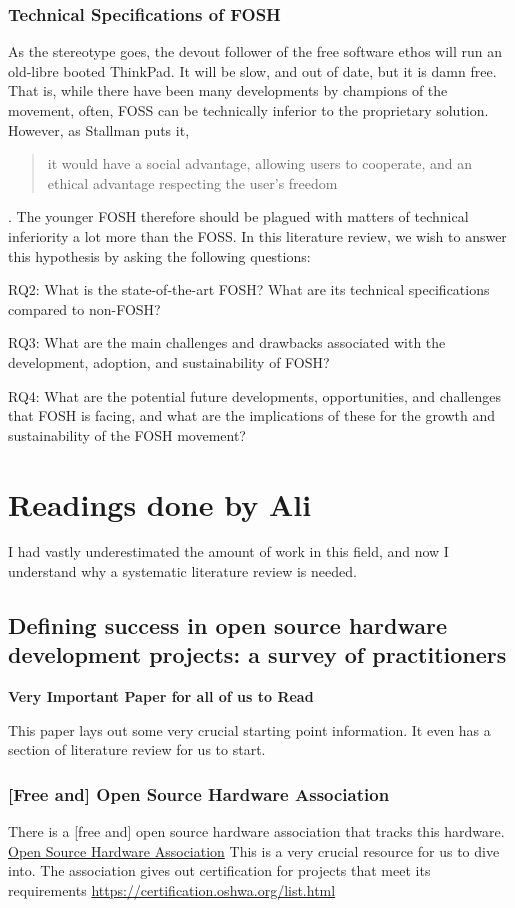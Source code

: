 \documentclass{article}
\begin{document}
\subsubsection{Technical Specifications of FOSH}
As the stereotype goes, the devout follower of the free software ethos will run an old-libre booted ThinkPad.
It will be slow, and out of date, but it is damn free. 
That is, while there have been many developments by champions of the movement, often, FOSS can be technically inferior to the proprietary solution. 
However, as Stallman puts it, 
\begin{quote}
it would have a social advantage, allowing users to cooperate, and an ethical advantage respecting the user's freedom 
\end{quote}
\cite{b0_stallman}.
The younger FOSH therefore should be plagued with matters of technical inferiority a lot more than the FOSS. 
In this literature review, we wish to answer this hypothesis by asking the following questions:

RQ2: What is the state-of-the-art FOSH? What are its technical specifications compared to non-FOSH? 

RQ3: What are the main challenges and drawbacks associated with the development, adoption, and sustainability of FOSH?

RQ4: What are the potential future developments, opportunities, and challenges that FOSH is facing, and what are the implications of these for the growth and sustainability of the FOSH movement?

\section{Readings done by Ali}

I had vastly underestimated the amount of work in this field, and now I understand why a systematic literature review is needed.

\subsection{Defining success in open source hardware development projects: a survey of practitioners}
\cite{p1_def_succ}

\textbf{Very Important Paper for all of us to Read}

This paper lays out some very crucial starting point information.
It even has a section of literature review for us to start.

\subsubsection{[Free and] Open Source Hardware Association}
There is a [free and] open source hardware association that tracks this hardware.
\href{https://www.oshwa.org}{Open Source Hardware Association}
This is a very crucial resource for us to dive into. 
The association gives out certification for projects that meet its requirements
\href{https://certification.oshwa.org/list.html}{https://certification.oshwa.org/list.html}
\end{document}
